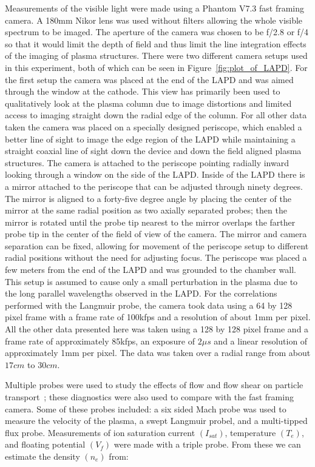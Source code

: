 \documentclass[%
 reprint,
 amsmath,amssymb,
 aps,
]{revtex4-1}
\begin{document}
Measurements of the visible light were made using a Phantom V7.3 fast framing camera. A 180mm Nikor lens was used without filters allowing the whole visible spectrum to be imaged. The aperture of the camera was chosen to be f/2.8 or f/4 so that it would limit the depth of field and thus limit the line integration effects of the imaging of plasma structures. There were two different camera setups used in this experiment, both of which can be seen in Figure~\ref{fig:plot_of_LAPD}.  For the first setup the camera was placed at the end of the LAPD and was aimed through the window at the cathode.  This view has primarily been used to qualitatively look at the plasma column due to image distortions and limited access to imaging straight down the radial edge of the column.  For all other data taken the camera was placed on a specially designed periscope, which enabled a better line of sight to image the edge region of the LAPD while maintaining a straight coaxial line of sight down the device and down the field aligned plasma structures. The camera is attached to the periscope pointing radially inward looking through a window on the side of the LAPD. Inside of the LAPD there is a mirror attached to the periscope that can be adjusted through ninety degrees. The mirror is aligned to a forty-five degree angle by placing the center of the mirror at the same radial position as two axially separated probes; then the mirror is rotated until the probe tip nearest to the mirror overlaps the farther probe tip in the center of the field of view of the camera. The mirror and camera separation can be fixed, allowing for movement of the periscope setup to different radial positions without the need for adjusting focus.  The periscope was placed a few meters from the end of the LAPD and was grounded to the chamber wall.  This setup is assumed to cause only a small perturbation in the plasma due to the long parallel wavelengths observed in the LAPD.  For the correlations performed with the Langmuir probe, the camera took data using a 64 by 128 pixel frame with a frame rate of 100kfps and a resolution of about 1mm per pixel.  All the other data presented here was taken using a 128 by 128 pixel frame and a frame rate of approximately 85kfps, an exposure of $2 \mu s$ and a linear resolution of approximately 1mm per pixel.  The data was taken over a radial range from about $17cm$ to $30cm$.
 
Multiple probes were used to study the effects of flow and flow shear on particle transport~\cite{schaffner12, schaffner13}; these diagnostics were also used to compare with the fast framing camera. Some of these probes included: a six sided Mach probe was used to measure the velocity of the plasma, a swept Langmuir probel, and a multi-tipped flux probe. Measurements of ion saturation current $(I_{sat})$, temperature $(T_e)$, and floating potential $(V_f)$ were made with a triple probe. From these we can estimate the density $(n_e)$ from:
\end{document}
